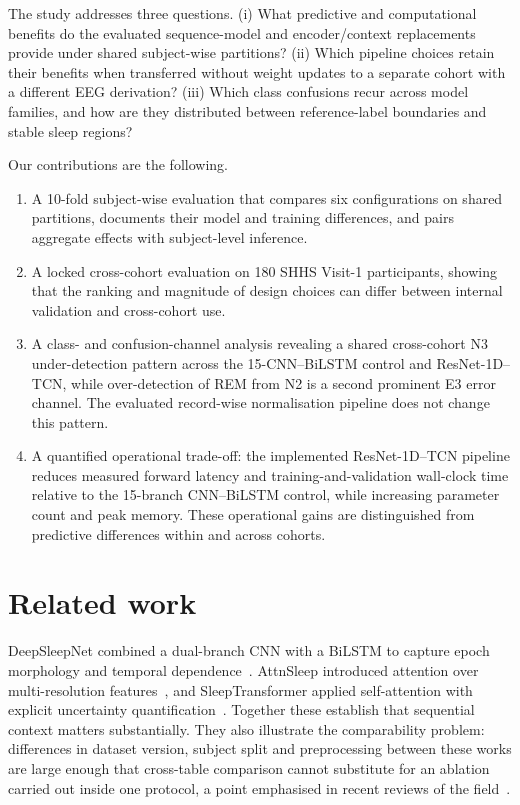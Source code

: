 \documentclass[11pt,a4paper]{article}
\begin{document}
The study addresses three questions. (i) What predictive and computational benefits do the evaluated
sequence-model and encoder/context replacements provide under shared subject-wise partitions?
(ii) Which pipeline choices retain their benefits when transferred without weight updates to a separate
cohort with a different EEG derivation? (iii) Which class confusions recur across model families, and
how are they distributed between reference-label boundaries and stable sleep regions?

Our contributions are the following.

\begin{enumerate}[label=(\arabic*)]
\item A 10-fold subject-wise evaluation that compares six configurations on shared partitions,
documents their model and training differences, and pairs aggregate effects with subject-level inference.
\item A locked cross-cohort evaluation on 180 SHHS Visit-1 participants, showing that the ranking and
magnitude of design choices can differ between internal validation and cross-cohort use.
\item A class- and confusion-channel analysis revealing a shared cross-cohort N3 under-detection pattern
across the 15-CNN--BiLSTM control and ResNet-1D--TCN, while over-detection of REM from N2 is a second
prominent E3 error channel. The evaluated record-wise normalisation pipeline does not change this pattern.
\item A quantified operational trade-off: the implemented ResNet-1D--TCN pipeline reduces measured
forward latency and training-and-validation wall-clock time relative to the 15-branch CNN--BiLSTM
control, while increasing parameter count and peak memory. These operational gains are distinguished
from predictive differences within and across cohorts.
\end{enumerate}

\section{Related work}

DeepSleepNet combined a dual-branch CNN with a BiLSTM to capture epoch morphology and temporal
dependence~\cite{supratak2017deepsleepnet}. AttnSleep introduced attention over multi-resolution
features~\cite{eldele2021attnsleep}, and SleepTransformer applied self-attention with explicit
uncertainty quantification~\cite{phan2022sleeptransformer}. Together these establish that sequential
context matters substantially. They also illustrate the comparability problem: differences in dataset
version, subject split and preprocessing between these works are large enough that cross-table
comparison cannot substitute for an ablation carried out inside one protocol, a point emphasised in
recent reviews of the field~\cite{phan2022review}.
\end{document}

